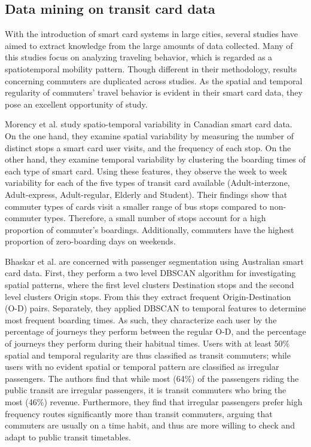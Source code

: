 \documentclass{article}
\begin{document}
\subsection{Data mining on transit card data}
With the introduction of smart card systems in large cities, several studies have aimed to extract knowledge from the large amounts of data collected. Many of this studies focus on analyzing traveling behavior, which is regarded as a spatiotemporal mobility pattern. Though different in their methodology, results concerning commuters are duplicated across studies. As the spatial and temporal regularity of commuters' travel behavior is evident in their smart card data, they pose an excellent opportunity of study.

Morency et al. \cite{morency2007measuring} study spatio-temporal variability in Canadian smart card data. On the one hand, they examine spatial variability by measuring the number of distinct stops a smart card user visits, and the frequency of each stop. On the other hand, they examine temporal variability by clustering the boarding times of each type of smart card. Using these features, they observe the week to week variability for each of the five types of transit card available (Adult-interzone, Adult-express, Adult-regular, Elderly and Student). Their findings show that commuter types of cards visit a smaller range of bus stops compared to non-commuter types. Therefore, a small number of stops account for a high proportion of commuter's boardings. Additionally, commuters have the highest proportion of zero-boarding days on weekends.

Bhaskar et al. \cite{bhaskar2015passenger} are concerned with passenger segmentation using Australian smart card data. First, they perform a two level DBSCAN algorithm for investigating spatial patterns, where the first level clusters Destination stops and the second level clusters Origin stops.  From this they extract frequent Origin-Destination (O-D) pairs. Separately, they applied DBSCAN to temporal features to determine most frequent boarding times.  As such, they characterize each user by the percentage of journeys they perform between the regular O-D, and the percentage of journeys they perform during their habitual times. Users with at least 50\% spatial and temporal regularity are thus classified as transit commuters; while users with no evident spatial or temporal pattern are classified as irregular passengers. The authors find that while most (64\%) of the passengers riding the public transit are irregular passengers, it is transit commuters who bring the most (46\%) revenue. Furthermore, they find that irregular passengers prefer high frequency routes significantly more than transit commuters, arguing that commuters are usually on a time habit, and thus are more willing to check and adapt to public transit timetables.
\end{document}
